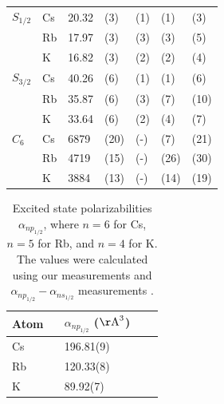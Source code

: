 \documentclass[twocolumn,pra,showpacs,superscriptaddress,longbibliography]{revtex4-1}   %
\newcommand{\sspace}{$\enspace$}
\newcommand{\AAA}{\mathrm{\AA}}
\begin{document}
\begin{table}
\begin{center}
\begin{tabular}{lllllll}
$S_{1/2}$ 			& Cs & 20.32 & (3) & (1) & (1) & (3) \\
 					& Rb & 17.97 & (3) & (3) & (3) & (5) \\
 					& K  & 16.82 & (3) & (2) & (2) & (4) \\ \hline
$S_{3/2}$ 			& Cs & 40.26 & (6) & (1) & (1) & (6) \\
 					& Rb & 35.87 & (6) & (3) & (7) & (10) \\
 					& K  & 33.64 & (6) & (2) & (4) & (7) \\ \hline
$C_6$ 				& Cs & 6879 & (20) & (-) & (7) & (21) \\ 
					& Rb & 4719 & (15) & (-) & (26) & (30) \\
 					& K  & 3884 & (13) & (-) & (14) & (19) \\ \hline
\hline
\end{tabular}
\end{center}
\end{table}
\endgroup




\begingroup
\begin{table}
\caption{\label{tableAbs}Excited state polarizabilities $\alpha_{np_{1/2}}$, where $n = 6$ for Cs, $n = 5$ for Rb, and $n = 4$ for K. The values were calculated using our measurements and $\alpha_{np_{1/2}} - \alpha_{ns_{1/2}}$ measurements \cite{Hunter1991,Miller1994}.}
\begin{center}
\begin{tabular}{llll}
\hline\hline
Atom \sspace & $\alpha_{np_{1/2}}$ ($\AAA^3$) \\
\hline
Cs & 196.81(9) \\
Rb & 120.33(8) \\
K  & 89.92(7) \\
\hline\hline
\end{tabular}
\end{center}
\end{table}
\endgroup
\end{document}
